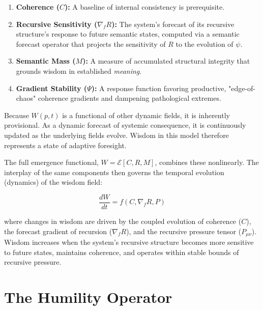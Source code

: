 \begin{enumerate}

    \item \textbf{Coherence (\(C\)):} A baseline of internal consistency is prerequisite.
    
    \item \textbf{Recursive Sensitivity (\(\nabla_f R\)):} The system's forecast of its recursive structure's response to future semantic states, computed via a semantic forecast operator that projects the sensitivity of \(R\) to the evolution of \(\psi\).
    
    \item \textbf{Semantic Mass (\(M\)):} A measure of accumulated structural integrity that grounds wisdom in established \textit{meaning}.
    
    \item \textbf{Gradient Stability (\(\Psi\)):} A response function favoring productive, "edge-of-chaos" coherence gradients and dampening pathological extremes.

\end{enumerate}

Because \(W(p,t)\) is a functional of other dynamic fields, it is inherently provisional. As a dynamic forecast of systemic consequence, it is continuously updated as the underlying fields evolve. Wisdom in this model therefore represents a state of adaptive foresight.

The full emergence functional, \(W = \mathcal{E}[C, R, M]\), combines these nonlinearly. The interplay of the same components then governs the temporal evolution (dynamics) of the wisdom field:

\begin{equation}
\frac{dW}{dt} = f(C, \nabla_f R, P)
\end{equation}

where changes in wisdom are driven by the coupled evolution of coherence (\(C\)), the forecast gradient of recursion (\(\nabla_f R\)), and the recursive pressure tensor (\(P_{\mu\nu}\)). Wisdom increases when the system's recursive structure becomes more sensitive to future states, maintains coherence, and operates within stable bounds of recursive pressure.


\section{The Humility Operator}
\label{8.3:the_humility_operator}


